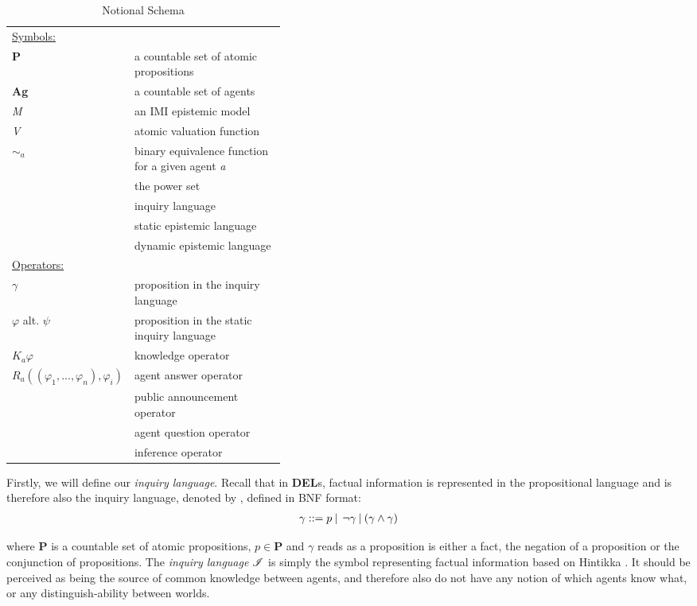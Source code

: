 \begin{table}[t]
	\caption{Notional Schema \label{notationalschema}}
	\begin{tabularx}{\linewidth}{p{0.40\linewidth}X}
		\toprule
		
		\multicolumn{2}{l}{{\underline{Symbols:}}}                                       \\
		\textbf{P} & a countable set of atomic propositions \\
		\textbf{Ag} & a countable set of agents \\
		\textit{M} & an IMI epistemic model \\
		\textit{V} & atomic valuation function \\
		$\sim_a$ & binary equivalence function for a given agent \textit{a} \\
		\textbf{\powset} & the power set \\
		\oracle & inquiry language \\
		\staticlang & static epistemic language \\
		\dynlang & dynamic epistemic language \\
		
		\multicolumn{2}{l}{{\underline{Operators:}}} \\  
		$\gamma$ & proposition in the inquiry language \\
		$\varphi$ alt. $\psi$ & proposition in the static inquiry language \\
		$K_a\varphi$ & knowledge operator \\
		$R_a((\varphi_1,...,\varphi_n), \varphi_i)$ & agent answer operator \\
		\pubop & public announcement operator \\
		\agquestop & agent question operator \\
		\infop & inference operator \\
		
		\bottomrule
	\end{tabularx}
\end{table}

Firstly, we will define our \textit{inquiry language}. Recall that in \textbf{DEL}s,
factual information is represented in the propositional language and is
therefore also the inquiry language, denoted by \oracle, defined in BNF format: 
\begin{align}
	\gamma::= p \:|\:\:\neg\gamma\:|\:(\gamma\land\gamma) \label{eq:1}
\end{align}

where \textbf{P} is a countable set of atomic propositions, $p \in\mathbf{P}$ and $\gamma$ reads as a proposition is either a fact, the negation of a proposition or the conjunction of propositions. The \textit{inquiry language} $\mathscr{I}$ is simply the symbol representing factual information based on Hintikka \cite{hintikka88}. It should be perceived as being the source of common knowledge between agents, and therefore also do not have any notion of which agents know what, or any distinguish-ability between worlds.


